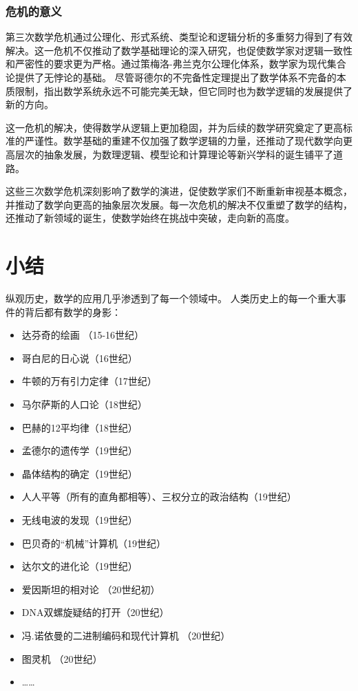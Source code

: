 \subsubsection{危机的意义}

第三次数学危机通过公理化、形式系统、类型论和逻辑分析的多重努力得到了有效解决。这一危机不仅推动了数学基础理论的深入研究，也促使数学家对逻辑一致性和严密性的要求更为严格。通过策梅洛-弗兰克尔公理化体系，数学家为现代集合论提供了无悖论的基础。
尽管哥德尔的不完备性定理提出了数学体系不完备的本质限制，指出数学系统永远不可能完美无缺，但它同时也为数学逻辑的发展提供了新的方向。

这一危机的解决，使得数学从逻辑上更加稳固，并为后续的数学研究奠定了更高标准的严谨性。数学基础的重建不仅加强了数学逻辑的力量，还推动了现代数学向更高层次的抽象发展，为数理逻辑、模型论和计算理论等新兴学科的诞生铺平了道路。

这些三次数学危机深刻影响了数学的演进，促使数学家们不断重新审视基本概念，并推动了数学向更高的抽象层次发展。每一次危机的解决不仅重塑了数学的结构，还推动了新领域的诞生，使数学始终在挑战中突破，走向新的高度。
\section{小结}

纵观历史，数学的应用几乎渗透到了每一个领域中。
人类历史上的每一个重大事件的背后都有数学的身影：
\begin{itemize}
\item 达芬奇的绘画 （15-16世纪）
\item 哥白尼的日心说（16世纪）
\item 牛顿的万有引力定律（17世纪）
\item 马尔萨斯的人口论（18世纪）
\item 巴赫的12平均律（18世纪）
\item 孟德尔的遗传学（19世纪）
\item 晶体结构的确定（19世纪）
\item 人人平等（所有的直角都相等）、三权分立的政治结构（19世纪）
\item 无线电波的发现（19世纪）
\item 巴贝奇的“机械”计算机（19世纪）
\item 达尔文的进化论（19世纪）
\item 爱因斯坦的相对论 （20世纪初）
\item DNA双螺旋疑结的打开（20世纪）
\item 冯.诺依曼的二进制编码和现代计算机 （20世纪）
\item 图灵机 （20世纪）
\item ……
\end{itemize}


\newpage
